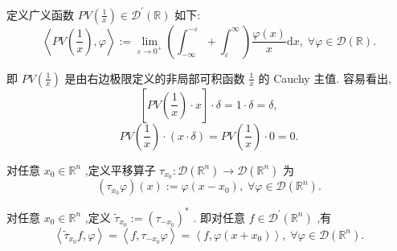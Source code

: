 \documentclass[lang=cn,newtx,10pt,scheme=chinese,thmcnt=chapter]{elegantbook}
\newcommand{\dif}{\mathrm{d}}
\begin{document}
\begin{example}
  定义广义函数 \({PV}\left( \frac{1}{x}\right)  \in  {\mathcal{D}}^{\prime }\left( \mathbb{R}\right)\) 如下:  
\begin{equation*}
  \left\langle  {{PV}\left( \frac{1}{x}\right) ,\varphi }\right\rangle   \mathrel{\text{ := }} \mathop{\lim }\limits_{{\varepsilon  \rightarrow  {0}^{ + }}}\left( {{\int }_{-\infty }^{-\varepsilon } + {\int }_{\varepsilon }^{\infty }}\right) \frac{\varphi \left( x\right) }{x}{\dif x},\;\forall \varphi  \in  \mathcal{D}\left( \mathbb{R}\right) .
  \end{equation*}
  
  即 \({PV}\left( \frac{1}{x}\right)\) 是由右边极限定义的非局部可积函数 \(\frac{1}{x}\) 的 Cauchy 主值. 容易看出,
\begin{equation*}
  \left\lbrack  {{PV}\left( \frac{1}{x}\right)  \cdot  x}\right\rbrack   \cdot  \delta  = 1 \cdot  \delta  = \delta ,
  \end{equation*}
  \begin{equation*}
  {PV}\left( \frac{1}{x}\right)  \cdot  \left( {x \cdot  \delta }\right)  = {PV}\left( \frac{1}{x}\right)  \cdot  0 = 0.
  \end{equation*}
  
\end{example}\begin{definition}
   对任意 \({x}_{0} \in  {\mathbb{R}}^{n}\) ,定义平移算子 \({\tau }_{{x}_{0}} : \mathcal{D}\left( {\mathbb{R}}^{n}\right)  \rightarrow  \mathcal{D}\left( {\mathbb{R}}^{n}\right)\) 为\begin{equation*}
  \left( {{\tau }_{{x}_{0}}\varphi }\right) \left( x\right)  \mathrel{\text{ := }} \varphi \left( {x - {x}_{0}}\right) ,\;\forall \varphi  \in  \mathcal{D}\left( {\mathbb{R}}^{n}\right) .
  \end{equation*}
  
  对任意 \({x}_{0} \in  {\mathbb{R}}^{n}\) ,定义 \({\widetilde{\tau }}_{{x}_{0}} \mathrel{\text{ := }} {\left( {\tau }_{-{x}_{0}}\right) }^{ * }\) . 即对任意 \(f \in  {\mathcal{D}}^{\prime }\left( {\mathbb{R}}^{n}\right)\) ,有
\begin{equation*}
  \left\langle  {{\widetilde{\tau }}_{{x}_{0}}f,\varphi }\right\rangle   = \left\langle  {f,{\tau }_{-{x}_{0}}\varphi }\right\rangle   = \left\langle  {f,\varphi \left( {x + {x}_{0}}\right) }\right\rangle  ,\;\forall \varphi  \in  \mathcal{D}\left( {\mathbb{R}}^{n}\right) .
  \end{equation*}
  
\end{definition}
\end{document}
